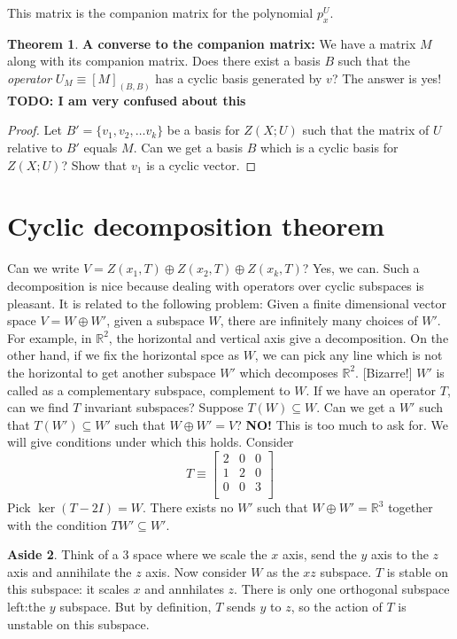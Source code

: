 \documentclass{book}
\newcommand{\R}{\ensuremath{\mathbb{R}}}
\newcommand{\osum}{\oplus} %
\theoremstyle{definition}
\newtheorem{theorem}{Theorem}
\newtheorem{aside}[theorem]{Aside}
\begin{document}
This matrix is the companion matrix for the polynomial $p^U_x$.

\begin{theorem}\textbf{A converse to the companion matrix:} We have
a matrix $M$ along with its companion matrix. Does there exist
a basis $B$ such that the \emph{operator} $U_M \equiv [M]_{(B, B)}$ has a
cyclic basis generated by $v$? The answer is yes!
\textbf{TODO: I am very confused about this}
\end{theorem}

\begin{proof}
Let $B' = \{ v_1, v_2, \dots v_k \}$ be a basis for $Z(X; U)$ such that 
the matrix of $U$ relative to $B'$ equals $M$. Can we get a basis $B$
which is a cyclic basis for $Z(X; U)$? Show that $v_1$ is a cyclic vector.
\end{proof}

\section{Cyclic decomposition theorem}
Can we write $V = Z(x_1, T) \osum Z(x_2, T) \osum Z(x_k, T)$? Yes, we can.
Such a decomposition is nice because dealing with operators over cyclic
subspaces is pleasant. It is related to the following problem: Given
a finite dimensional vector space $V = W \osum W'$, given a subspace $W$,
there are infinitely many choices of $W'$. For example, in $\R^2$, the horizontal
and vertical axis give a decomposition. On the other hand, if we fix the
horizontal spce as $W$, we can pick any line which is not the horizontal to
get another subspace $W'$ which decomposes $\R^2$. [Bizarre!] $W'$ is called
as a complementary subspace, complement to $W$.  
If we have an operator $T$, can we find $T$ invariant subspaces? Suppose
$T(W) \subseteq W$. Can we get a $W'$ such that $T(W') \subseteq W'$ such
that $W \osum W' = V$? \textbf{NO!} This is too much to ask for. We will give
conditions under which this holds. Consider 
$$T \equiv
\begin{bmatrix}
2 & 0 & 0 \\
1 & 2 & 0 \\
0 & 0 & 3 \\
\end{bmatrix}
$$
Pick $\ker(T - 2I) = W$. There exists no $W'$ such that $W \osum W' = \R^3$
together with the condition $T W' \subseteq W'$.

\begin{aside}
Think of a 3 space where we scale the $x$ axis, send the $y$ axis to the $z$
axis and annihilate the $z$ axis. Now consider $W$ as the $xz$ subspace.
$T$ is stable on this subspace: it scales $x$ and annhilates $z$.
There is only one orthogonal subspace left:the $y$ subspace. But by definition,
$T$ sends $y$ to $z$, so the action of $T$ is unstable on this subspace.
\end{aside}
\end{document}
